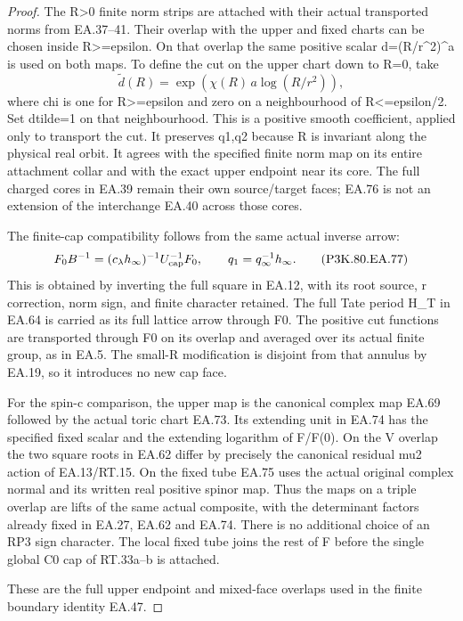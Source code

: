 \begin{proof}
The R>0 finite norm strips are attached with their
actual transported norms from EA.37--41. Their
overlap with the upper and fixed charts can be
chosen inside R>=epsilon. On that overlap the
same positive scalar d=(R/r\textasciicircum{}2)\textasciicircum{}a is used on both
maps. To define the cut on the upper chart down
to R=0, take
\[
 \widetilde d(R)=
 \exp\!\left(\chi(R)\,a\log(R/r^2)\right),
 \tag{P3K.80.EA.76}
\]
where chi is one for R>=epsilon and zero on a
neighbourhood of R<=epsilon/2. Set dtilde=1 on
that neighbourhood. This is a positive smooth
coefficient, applied only to transport the cut.
It preserves q1,q2 because R is invariant along
the physical real orbit. It agrees with the
specified finite norm map on its entire attachment
collar and with the exact upper endpoint near its
core. The full charged cores in EA.39 remain their
own source/target faces; EA.76 is not an extension
of the interchange EA.40 across those cores.

The finite-cap compatibility follows from the
same actual inverse arrow:
\[
 F_0 B^{-1}=(c_\lambda h_\infty)^{-1}
                         U_{\rm cap}^{-1}F_0,
 \qquad q_1=q_\infty^{-1}h_\infty .
 \tag{P3K.80.EA.77}
\]
This is obtained by inverting the full square in
EA.12, with its root source, r correction, norm sign,
and finite character retained. The full Tate period H\_T in
EA.64 is carried as its full lattice arrow through
F0. The positive cut functions are transported
through F0 on its overlap and averaged over its
actual finite group, as in EA.5. The small-R
modification is disjoint from that annulus by
EA.19, so it introduces no new cap face.

For the spin-c comparison, the upper map is the
canonical complex map EA.69 followed by the
actual toric chart EA.73. Its extending unit in
EA.74 has the specified fixed scalar and the
extending logarithm of F/F(0). On the V overlap
the two square roots in EA.62 differ by precisely
the canonical residual mu2 action of EA.13/RT.15.
On the fixed tube EA.75 uses the actual original
complex normal and its written real positive
spinor map. Thus the maps on a triple overlap
are lifts of the same actual composite, with
the determinant factors already fixed in EA.27,
EA.62 and EA.74. There is no additional choice
of an RP3 sign character. The local fixed tube
joins the rest of F before the single global
C0 cap of RT.33a--b is attached.

These are the full upper endpoint and mixed-face overlaps used in the finite boundary identity EA.47.


\end{proof}
